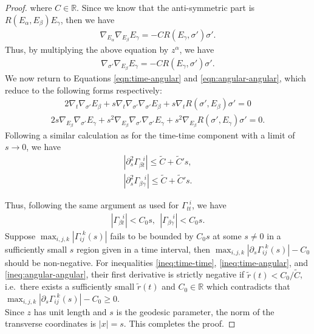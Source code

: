 \documentclass[pdflatex,sn-mathphys-num]{sn-jnl}
\theoremstyle{definition}
\begin{document}
\begin{proof}
where $C \in \mathbb{R}$. Since we know that the anti-symmetric part is $R(E_{\alpha},E_{\beta})E_{\gamma}$, then we have
\begin{align*}
    \nabla_{E_{\alpha}}\nabla_{E_{\beta}}E_{\gamma} = - CR(E_{\gamma},\sigma')\sigma'.
\end{align*}
Thus, by multiplying the above equation by $z^{\alpha}$, we have
\begin{align*}
    \nabla_{\sigma'}\nabla_{E_{\beta}}E_{\gamma} = - CR(E_{\gamma},\sigma')\sigma'.
\end{align*}
We now return to Equations \ref{eqn:time-angular} and \ref{eqn:angular-angular}, which reduce to the following forms respectively:
\begin{align}
    2\nabla_{t}\nabla_{\sigma'}E_{\beta} + s\nabla_{t}\nabla_{\sigma'}\nabla_{\sigma'}E_{\beta} + s\nabla_{t}R(\sigma',E_{\beta})\sigma' = 0
\end{align}
\begin{align}
    2s\nabla_{E_{\beta}}\nabla_{\sigma'}E_{\gamma} + s^2\nabla_{E_{\beta}}\nabla_{\sigma'}\nabla_{\sigma'}E_{\gamma} + s^2\nabla_{E_{\beta}}R(\sigma',E_{\gamma})\sigma' = 0.
\end{align}
Following a similar calculation as for the time-time component with a limit of $s \rightarrow 0$, we have
\begin{align}
    |\partial_{s}^2\Gamma_{\beta t}^{~~~i}| \leq \tilde{C} + \tilde{C}'s\label{ineq:time-angular},
\end{align}
\begin{align}
    |\partial_{s}^2\Gamma_{\beta \gamma}^{~~~~i}| \leq \tilde{C} + \tilde{C}'s.\label{ineq:angular-angular}
\end{align}

Thus, following the same argument as used for $\Gamma_{tt}^{~~i}$, we have
\begin{align*}
    |\Gamma_{\beta t}^{~~~i}| < C_0s,~~ |\Gamma_{\beta \gamma}^{~~~~i}| < C_0s.
\end{align*}
Suppose $\max_{i,j,k}|\Gamma_{i j}^{~~k}(s)|$ fails to be bounded by $C_0s$ at some $s \neq 0$ in a sufficiently small $s$ region given in a time interval, then $\max_{i,j,k}|\partial_s\Gamma_{i j}^{~~k}(s)| - C_0$ should be non-negative. For inequalities \ref{ineq:time-time}, \ref{ineq:time-angular}, and \ref{ineq:angular-angular}, their first derivative is strictly negative if $\tilde{r}(t) < C_0/\tilde{C}$, i.e.\ there exists a sufficiently small $\tilde{r}(t)$ and $C_0 \in \mathbb{R}$ which contradicts that $\max_{i,j,k}|\partial_s\Gamma_{i j}^{~~k}(s)| - C_0 \geq 0$. \\

Since $z$ has unit length and $s$ is the geodesic parameter, the norm of the transverse coordinates is $|x| = s$. This completes the proof.

\end{proof}
\end{document}

